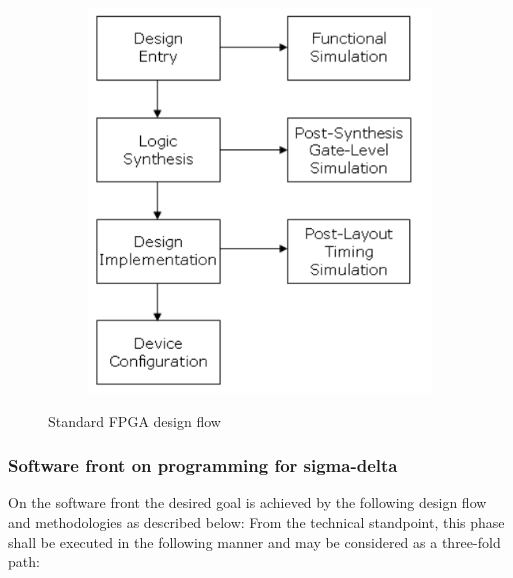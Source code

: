 \documentclass{FR16}
\begin{document}
  \begin{figure}[H]
 
    \begin{subfigure}{\textwidth}
    \includegraphics[scale=0.8]{fpga_designflow.png} 
    \label{fig:DJp1}
    \end{subfigure}
 
 \caption{Standard FPGA design flow}
\label{fig6}
\end{figure}








\subsubsection{Software front on programming for sigma-delta}
On the software front the desired goal is achieved by the following design flow and methodologies as described below:
From the technical standpoint, this phase shall be executed in the following manner and may be considered as a three-fold path:
\end{document}
